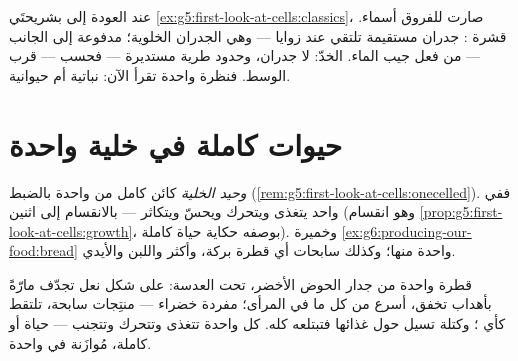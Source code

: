 \begin{example}\label{ex:g6:cell-unit-of-life:slides}
عند العودة إلى  بشريحتَي
\cref{ex:g5:first-look-at-cells:classics}، صارت للفروق أسماء.
قشرة : جدران مستقيمة تلتقي عند زوايا --- وهي الجدران
الخلوية؛  مدفوعة إلى الجانب --- من فعل جيب الماء. 
الخدّ: لا جدران، وحدود طرية مستديرة ---  فحسب ---  قرب
الوسط. فنظرة واحدة تقرأ الآن: نباتية أم حيوانية.
\end{example}

\section{حيوات كاملة في خلية واحدة}

\begin{definition}\label{def:g6:cell-unit-of-life:unicellular}
 \emph{وحيد الخلية} كائن كامل من
 واحدة بالضبط
(\cref{rem:g5:first-look-at-cells:onecelled}). ففي  واحد
يتغذى ويتحرك ويحسّ ويتكاثر --- بالانقسام إلى اثنين
(وهو انقسام \cref{prop:g5:first-look-at-cells:growth}، بوصفه حكاية
حياة كاملة). وخميرة \cref{ex:g6:producing-our-food:bread} واحدة
منها؛ وكذلك سابحات أي قطرة بركة، وأكثر   واللبن
والأيدي.
\end{definition}

\begin{example}\label{ex:g6:cell-unit-of-life:drop}
قطرة واحدة من جدار الحوض الأخضر، تحت العدسة:  على شكل نعل
تجدّف مارّةً بأهداب تخفق، أسرع من كل ما في المرأى؛  مفردة
خضراء --- منتِجات سابحة، تلتقط  كأي ؛ وكتلة تسيل حول
غذائها فتبتلعه كله. كل واحدة تتغذى وتتحرك وتتجنب --- حياة  أو
 كاملة، مُوازَنة في  واحدة.
\end{example}

